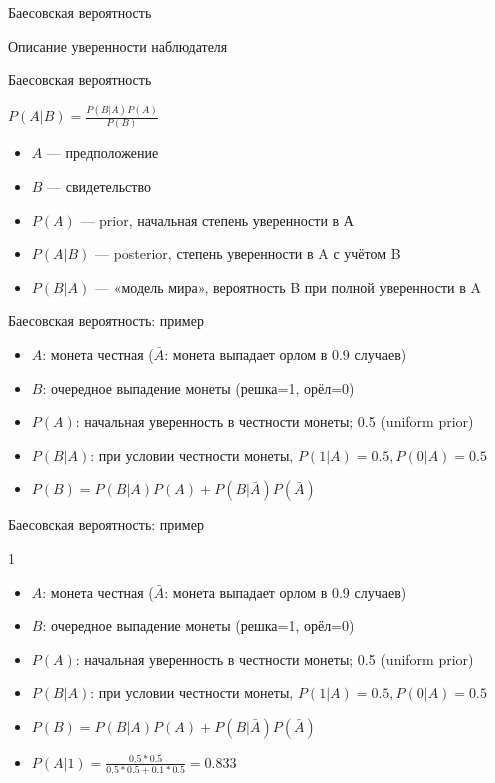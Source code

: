 \documentclass[10pt]{beamer}
\begin{document}
\begin{frame}{Баесовская вероятность}
  \begin{center}
    \Large
    Описание уверенности наблюдателя
  \end{center}
\end{frame}

\begin{frame}{Баесовская вероятность}
  \begin{center}
    $P(A|B) = \frac{P(B|A)P(A)}{P(B)}$
  \end{center}
  \begin{itemize}
  \item $A$ — предположение
  \item $B$ — свидетельство
  \item $P(A)$ — prior, начальная степень уверенности в А
  \item $P(A|B)$ — posterior, степень уверенности в A с учётом B
  \item $P(B|A)$ — «модель мира», вероятность B при полной уверенности в A
  \end{itemize}
\end{frame}

\begin{frame}{Баесовская вероятность: пример}
  \begin{itemize}
  \item $A$: монета честная ($\bar{A}$: монета выпадает орлом в 0.9 случаев)
  \item $B$: очередное выпадение монеты (решка=1, орёл=0)
  \item $P(A)$: начальная уверенность в честности монеты; 0.5 (uniform
    prior)
  \item $P(B|A)$: при условии честности монеты, $P(1|A)=0.5,
    P(0|A)=0.5$
  \item $P(B) = P(B|A)P(A) + P(B|\bar{A})P(\bar{A})$
  \end{itemize}
\end{frame}

\begin{frame}{Баесовская вероятность: пример}
  \begin{center}
    1
  \end{center}
  \begin{itemize}
  \item $A$: монета честная ($\bar{A}$: монета выпадает орлом в 0.9 случаев)
  \item $B$: очередное выпадение монеты (решка=1, орёл=0)
  \item $P(A)$: начальная уверенность в честности монеты; 0.5 (uniform
    prior)
  \item $P(B|A)$: при условии честности монеты, $P(1|A)=0.5,
    P(0|A)=0.5$
  \item $P(B) = P(B|A)P(A) + P(B|\bar{A})P(\bar{A})$
  \item $P(A|1)=\frac{0.5 * 0.5}{0.5 * 0.5 + 0.1 * 0.5} = 0.833$
  \end{itemize}
\end{frame}
\end{document}
